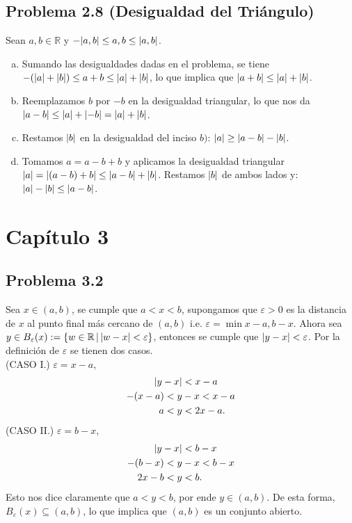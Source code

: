 \documentclass[conference]{IEEEtran}
\newcommand{\R}{\mathbb{R}}
\begin{document}
\subsection{Problema 2.8 (Desigualdad del Triángulo)}
Sean $a,b \in \R$ y $-\abs{a,b} \leq a,b \leq \abs{a,b}$.

\begin{enumerate}[a)]
	\item Sumando las desigualdades dadas en el problema, se tiene $ -(\abs{a} + \abs{b}) \leq a+b \leq \abs{a} + \abs{b} $, lo que implica que $\abs{a + b} \leq \abs{a} + \abs{b}$.
	\item Reemplazamos $b$ por $-b$ en la desigualdad triangular, lo que nos da $\abs{a - b} \leq \abs{a} + \abs{-b} = \abs{a} + \abs{b}$.
	\item Restamos $\abs{b}$ en la desigualdad del inciso $b)$: $\abs{a} \geq \abs{a - b} - \abs{b}$. 
	\item Tomamos $a = a - b + b$ y aplicamos la desigualdad triangular $\abs{a} = \abs{(a - b) + b} \leq \abs{a - b} + \abs{b}$. Restamos $\abs{b}$ de ambos lados y: $\abs{a} - \abs{b} \leq \abs{a - b}$.
\end{enumerate}




\section{Capítulo 3}

\subsection{Problema 3.2}
Sea $x \in (a,b)$, se cumple que $a < x < b$, supongamos que $\varepsilon > 0$ es la distancia de $x$ al punto final más cercano de $(a,b)$ i.e. $\varepsilon = \min{x-a,b-x}$. Ahora sea $y\in B_\varepsilon (x) := \{ w\in \R \, | \, \abs{w-x} < \varepsilon \}$, entonces se cumple que $\abs{y-x} < \varepsilon$. Por la definición de $\varepsilon$ se tienen dos casos. \\

(CASO I.) $\varepsilon = x - a$,
	\begin{align*}
		\abs{y - x} &<  x - a \\
		-(x - a) < y &- x < x - a \\
		a < y &< 2x - a. 
	\end{align*}
(CASO II.) $\varepsilon = b - x$,
	\begin{align*}
		\abs{y - x} &<  b - x \\
		-(b - x) < y &- x < b - x \\
		2x - b < y &< b. 
	\end{align*}
Esto nos dice claramente que $a < y < b$, por ende $y\in (a,b)$. De esta forma, $B_\varepsilon (x) \subseteq (a,b)$, lo que implica que $(a,b)$ es un conjunto abierto.
\end{document}
